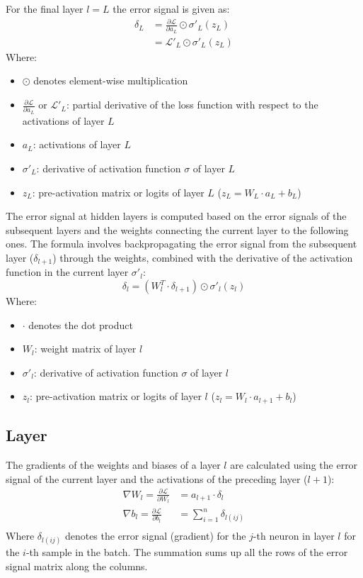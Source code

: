 \documentclass[a4paper]{article}
\newcommand{\ELL}{\mathcal{L}}
\begin{document}
For the final layer $l=L$ the error signal is given as:
\begin{align*}
    \delta_L &= \frac{\partial\ELL}{\partial a_L} \odot \sigma'_L(z_L)\\
                &= \ELL'_L \odot \sigma'_L(z_L)
\end{align*}
Where:
\begin{itemize}
    \item $\odot$ denotes element-wise multiplication
    \item $\frac{\partial\ELL}{\partial a_L}$ or $\ELL'_L$: partial derivative of the loss function with respect to the activations of layer $L$
    \item $a_L$: activations of layer $L$
    \item $\sigma'_L$: derivative of activation function $\sigma$ of layer $L$
    \item $z_L$: pre-activation matrix or logits of layer $L$ ($z_L = W_L\cdot a_L + b_L$)
\end{itemize}
The error signal at hidden layers is computed based on the error signals of the subsequent layers and the weights connecting the current layer to the following ones. The formula involves backpropagating the error signal from the subsequent layer ($\delta_{l+1}$) through the weights, combined with the derivative of the activation function in the current layer $\sigma'_l$:
\begin{equation*}
    \delta_l = (W_l^T \cdot \delta_{l+1}) \odot \sigma'_l(z_l)
\end{equation*}
Where:
\begin{itemize}
    \item $\cdot$ denotes the dot product
    \item $W_l$: weight matrix of layer $l$
    \item $\sigma'_l$: derivative of activation function $\sigma$ of layer $l$
    \item $z_l$: pre-activation matrix or logits of layer $l$ ($z_l = W_l\cdot a_{l+1} + b_l$)
\end{itemize}

\subsection*{Layer}
The gradients of the weights and biases of a layer $l$ are calculated using the error signal of the current layer and the activations of the preceding layer ($l+1$):
\begin{align*}
    \nabla W_l = \frac{\partial\ELL}{\partial W_l} &= a_{l+1} \cdot \delta_l \\
    \nabla b_l =\frac{\partial\ELL}{\partial b_l} &= \sum_{i=1}^{n} \delta_{l(ij)} \\
\end{align*}
Where $\delta_{l(ij)}$ denotes the error signal (gradient) for the $j$-th neuron in layer $l$ for the $i$-th sample in the batch. The summation sums up all the rows of the error signal matrix along the columns.
\end{document}
